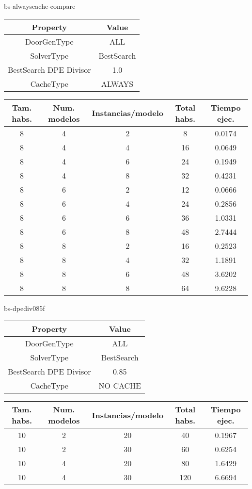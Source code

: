 bs-alwayscache-compare
\begin{center}
	\begin{tabular}{ | c | c | }
\hline
 		Property & Value \\ \hline
DoorGenType & ALL \\ 
SolverType & BestSearch \\ 
BestSearch DPE Divisor & 1.0 \\ 
CacheType & ALWAYS \\ 
\hline
	\end{tabular}
\end{center}

\begin{center}
	\begin{tabular}{ | c | c | c | c | c | }
\hline
Tam. habs. & Num. modelos & Instancias/modelo & Total habs. & Tiempo ejec. \\ \hline 
8 & 4 & 2 & 8 & 0.0174 \\ 
8 & 4 & 4 & 16 & 0.0649 \\ 
8 & 4 & 6 & 24 & 0.1949 \\ 
8 & 4 & 8 & 32 & 0.4231 \\ 
8 & 6 & 2 & 12 & 0.0666 \\ 
8 & 6 & 4 & 24 & 0.2856 \\ 
8 & 6 & 6 & 36 & 1.0331 \\ 
8 & 6 & 8 & 48 & 2.7444 \\ 
8 & 8 & 2 & 16 & 0.2523 \\ 
8 & 8 & 4 & 32 & 1.1891 \\ 
8 & 8 & 6 & 48 & 3.6202 \\ 
8 & 8 & 8 & 64 & 9.6228 \\ 
\hline
	\end{tabular}
\end{center}

bs-dpediv085f
\begin{center}
	\begin{tabular}{ | c | c | }
\hline
 		Property & Value \\ \hline
DoorGenType & ALL \\ 
SolverType & BestSearch \\ 
BestSearch DPE Divisor & 0.85 \\ 
CacheType & NO CACHE \\ 
\hline
	\end{tabular}
\end{center}

\begin{center}
	\begin{tabular}{ | c | c | c | c | c | }
\hline
Tam. habs. & Num. modelos & Instancias/modelo & Total habs. & Tiempo ejec. \\ \hline 
10 & 2 & 20 & 40 & 0.1967 \\ 
10 & 2 & 30 & 60 & 0.6254 \\ 
10 & 4 & 20 & 80 & 1.6429 \\ 
10 & 4 & 30 & 120 & 6.6694 \\ 
\hline
	\end{tabular}
\end{center}

